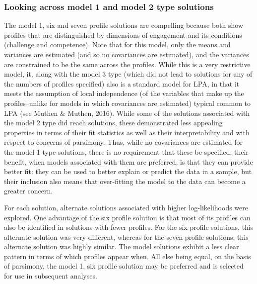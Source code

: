 \documentclass[]{msu-thesis}
\theoremstyle{definition}
\theoremstyle{definition}
\theoremstyle{definition}
\theoremstyle{remark}
\begin{document}
\subsubsection{Looking across model 1 and model 2 type
solutions}\label{looking-across-model-1-and-model-2-type-solutions}

The model 1, six and seven profile solutions are compelling because both
show profiles that are distinguished by dimensions of engagement and its
conditions (challenge and competence). Note that for this model, only
the means and variances are estimated (and so no covariances are
estimated), and the variances are constrained to be the same across the
profiles. While this is a very restrictive model, it, along with the
model 3 type (which did not lead to solutions for any of the numbers of
profiles specified) also is a standard model for LPA, in that it meets
the assumption of local independence (of the variables that make up the
profiles--unlike for models in which covariances are estimated) typical
common to LPA (see Muthen \& Muthen, 2016). While some of the solutions
associated with the model 2 type did reach solutions, these demonstrated
less appealing properties in terms of their fit statistics as well as
their interpretability and with respect to concerns of parsimony. Thus,
while no covariances are estimated for the model 1 type solutions, there
is no requirement that these be specified; their benefit, when models
associated with them are preferred, is that they can provide better fit:
they can be used to better explain or predict the data in a sample, but
their inclusion also means that over-fitting the model to the data can
become a greater concern.

For each solution, alternate solutions associated with higher
log-likelihoods were explored. One advantage of the six profile solution
is that most of its profiles can also be identified in solutions with
fewer profiles. For the six profile solutions, this alternate solution
was very different, whereas for the seven profile solutions, this
alternate solution was highly similar. The model solutions exhibit a
less clear pattern in terms of which profiles appear when. All else
being equal, on the basis of parsimony, the model 1, six profile
solution may be preferred and is selected for use in subsequent
analyses.
\end{document}
